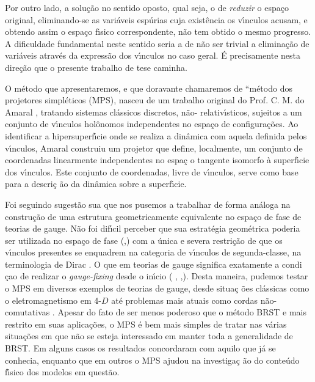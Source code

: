 \documentclass[a4paper,thmsa,12pt]{report}
\begin{document}
Por outro lado, a solu\c{c}\~{a}o no sentido oposto, qual seja, o de \textit{%
reduzir }o espa\c{c}o original, eliminando-se as vari\'{a}veis esp\'{u}rias
cuja exist\^{e}ncia os v\'{\i}nculos acusam, e obtendo assim o espa\c{c}o
f\'{\i}sico correspondente, n\~{a}o tem obtido o mesmo progresso. A
dificuldade fundamental neste sentido seria a de n\~{a}o ser trivial a
elimina\c{c}\~{a}o de vari\'{a}veis atrav\'{e}s da express\~{a}o dos
v\'{\i}nculos no caso geral. \'{E} precisamente nesta dire\c{c}\~{a}o que o
presente trabalho de tese caminha.

O m\'{e}todo que apresentaremos, e que doravante chamaremos de ``m\'{e}todo
dos projetores simpl\'{e}ticos (MPS), nasceu de um trabalho original do
Prof. C. M. do Amaral \cite{cma}, tratando sistemas cl\'{a}ssicos discretos,
n\~{a}o- relativ\'{\i}sticos, sujeitos a um conjunto de v\'{\i}nculos
hol\^{o}nomos independentes no espa\c{c}o de configura\c{c}\~{o}es. Ao
identificar a hipersuperf\'{\i}cie onde se realiza a din\^{a}mica com aquela
definida pelos v\'{\i}nculos, Amaral construiu um projetor que define,
localmente, um conjunto de coordenadas linearmente independentes no espa\c{c}%
o tangente isomorfo \`{a} superf\'{\i}cie dos v\'{\i}nculos. Este conjunto
de coordenadas, livre de v\'{\i}nculos, serve como base para a descri\c{c}%
\~{a}o da din\^{a}mica sobre a superf\'{\i}cie.

Foi seguindo sugest\~{a}o sua que nos pusemos a trabalhar de forma
an\'{a}loga na constru\c{c}\~{a}o de uma estrutura geometricamente
equivalente no espa\c{c}o de fase de teorias de gauge. N\~{a}o foi
dif\'{\i}cil perceber que sua estrat\'{e}gia geom\'{e}trica poderia ser
utilizada no espa\c{c}o de fase (\cite{cma e pitanga},\cite{pitanga}) com a
\'{u}nica e severa restri\c{c}\~{a}o de que os v\'{\i}nculos presentes se
enquadrem na categoria de v\'{\i}nculos de segunda-classe, na terminologia
de Dirac \cite{dirac}. O que em teorias de gauge significa exatamente a condi%
\c{c}ao de realizar o \textit{gauge-fixing }desde o in\'{\i}cio (\cite
{sudarsham} ,\cite{sundermeyer} ,\cite{teitelboim}). Desta maneira, pudemos
testar o MPS em diversos exemplos de teorias de gauge, desde situa\c{c}%
\~{o}es cl\'{a}ssicas como o eletromagnetismo em 4-$D$ \cite{qed} at\'{e}
problemas mais atuais como cordas n\~{a}o-comutativas \cite{mmi}. Apesar do
fato de ser menos poderoso que o m\'{e}todo BRST e mais restrito em suas
aplica\c{c}\~{o}es, o MPS \'{e} bem mais simples de tratar nas v\'{a}rias
situa\c{c}\~{o}es em que n\~{a}o se esteja interessado em manter toda a
generalidade de BRST. Em alguns casos os resultados concordaram com aquilo
que j\'{a} se conhecia, enquanto que em outros o MPS ajudou na investiga\c{c}%
\~{a}o do conte\'{u}do f\'{\i}sico dos modelos em quest\~{a}o.
\end{document}
